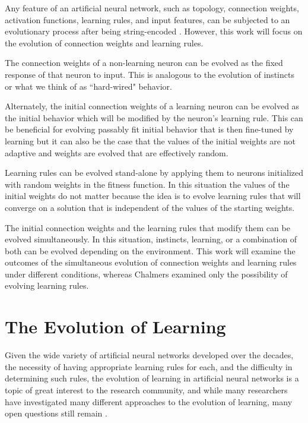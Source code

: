 \documentclass[master]{outhesis}
\begin{document}
Any feature of an artificial neural network, such as topology, connection weights, activation functions, learning rules, and input features, can be subjected to an evolutionary process after being string-encoded \citep{Yao:1999lp}.
However, this work will focus on the evolution of connection weights and learning rules.

The connection weights of a non-learning neuron can be evolved as the fixed response of that neuron to input.
This is analogous to the evolution of instincts or what we think of as ``hard-wired" behavior.

Alternately, the initial connection weights of a learning neuron can be evolved as the initial behavior which will be modified by the neuron's learning rule.
This can be beneficial for evolving passably fit initial behavior that is then fine-tuned by learning
but it can also be the case that the values of the initial weights are not adaptive and weights are evolved that are effectively random.

Learning rules can be evolved stand-alone by applying them to neurons initialized with random weights in the fitness function.
In this situation the values of the initial weights do not matter because the idea is to evolve learning rules that will converge on a solution that is independent of the values of the starting weights.

The initial connection weights and the learning rules that modify them can be evolved simultaneously.
In this situation, instincts, learning, or a combination of both can be evolved depending on the environment.
This work will examine the outcomes of the simultaneous evolution of connection weights and learning rules under different conditions,
whereas Chalmers examined only the possibility of evolving learning rules.

\section{The Evolution of Learning}

Given the wide variety of artificial neural networks developed over the decades,
the necessity of having appropriate learning rules for each,
and the difficulty in determining such rules,
the evolution of learning in artificial neural networks is a topic of great interest to the research community, 
and while many researchers have investigated many different approaches to the evolution of learning,
many open questions still remain \citep{Soltoggio:2017bl}.
\end{document}
